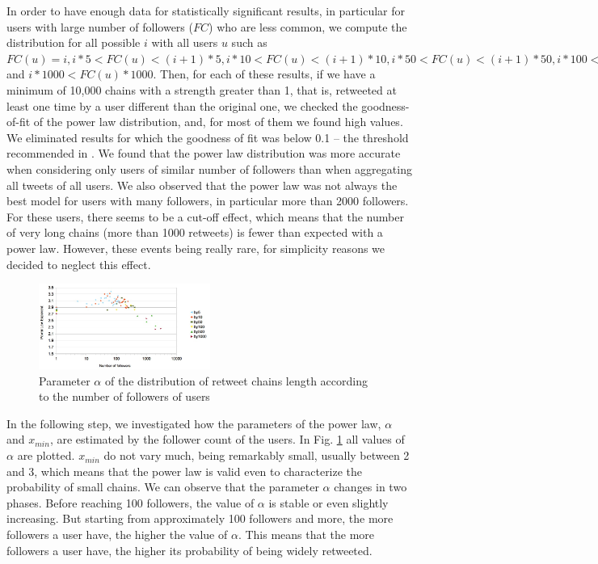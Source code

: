 \documentclass[conference]{IEEEtran}
\begin{document}
In order to have enough data for statistically significant results, in particular for users with large number of followers ($FC$) who are less common, we compute the distribution for all possible $i$  with all users $u$ such as $FC(u)=i, i*5 < FC(u) < (i+1)*5,i*10 < FC(u) < (i+1)*10, i*50 < FC(u) < (i+1)*50, i*100 <FC(u)*100, i*500 <FC(u)*500$ and $i*1000 <FC(u)*1000$.
Then, for each of these results, if we have a minimum of 10,000 chains with a strength greater than 1, that is, retweeted at least one time by a user different than the original one, we checked the goodness-of-fit of the power law distribution, and, for most of them we found high values. We eliminated results for which the goodness of fit was below 0.1 -- the threshold recommended in \cite{clauset2009power}. We found that the power law distribution was more accurate when considering only users of similar number of followers than when aggregating all tweets of all users. We also observed that the power law was not always the best model for users with many followers, in particular more than 2000 followers. For these users, there seems to be a cut-off effect, which means that the number of very long chains (more than 1000 retweets) is fewer than expected with a power law. However, these events being really rare, for simplicity reasons we decided to neglect this effect.



  \begin{figure}[h]
\includegraphics[width=0.5\textwidth]{data/evolutionAlphaParameter.jpg}
\caption{Parameter $\alpha$ of the distribution of retweet chains length according to the number of followers of users}

    \label{fig:evolutionAlphaAll}
\end{figure}

In the following step, we investigated how the parameters of the power law, $\alpha$ and $x_{min}$, are estimated by the follower count of the users.
In Fig. \ref{fig:evolutionAlphaAll} all values of $\alpha$ are plotted. $x_{min}$ do not vary much, being remarkably small, usually between 2 and 3, which means that the power law is valid even to characterize the probability of small chains.
We can observe that the parameter $\alpha$ changes in two phases. Before reaching 100 followers, the value of $\alpha$ is stable or even slightly increasing. But starting from approximately 100 followers and more, the more followers a user have, the higher the value of $\alpha$. This means that the more followers a user have, the higher its probability of being widely retweeted.
\end{document}
